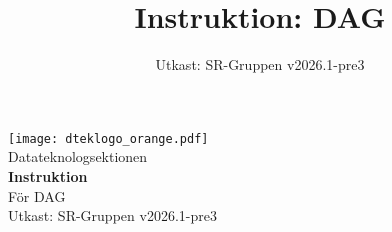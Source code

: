 \documentclass[a4paper]{dtek}
\title{Instruktion: DAG}
\date{Utkast: SR-Gruppen v2026.1-pre3}
\begin{document}
\begin{titlepage}
  \thispagestyle{empty} %
  \vspace*{\fill}
  \begin{center}
    \texttt{[image: dteklogo\_orange.pdf]}\\[3em]
    {\Huge Datateknologsektionen}\\[3em]
    {\Huge \textbf{Instruktion}}\\[1em]
    {\Huge För DAG}\\[3em]
    Utkast: SR-Gruppen v2026.1-pre3\\[20em]
  \end{center}
  \vspace*{\fill}
\end{titlepage}

\makeheadfoot

\setcounter{tocdepth}{2}
\tableofcontents
\end{document}
